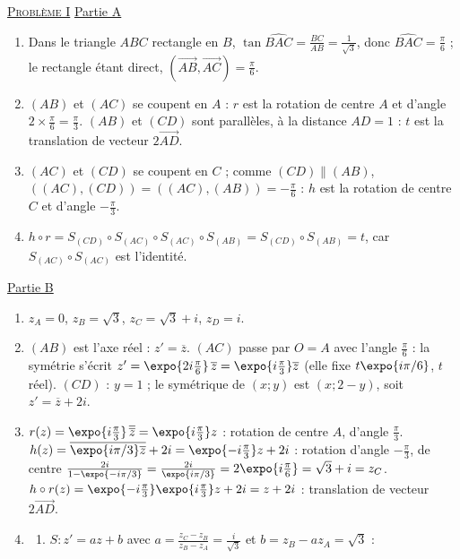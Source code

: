 \begin{corrige}
\noindent \underline{\textsc{Probl\`eme I}} \newline
\underline{Partie A}
\begin{enumerate}
\item Dans le triangle $ABC$ rectangle en $B$, $\tan\widehat{BAC} = \frac{BC}{AB} = \frac{1}{\sqrt{3}}$, donc $\widehat{BAC} = \frac{\pi}{6}$ ;
      le rectangle \'etant direct, $(\overrightarrow{AB}, \overrightarrow{AC}) = \frac{\pi}{6}$.
\item $(AB)$ et $(AC)$ se coupent en $A$ : $r$ est la rotation de centre $A$ et d'angle $2 \times \frac{\pi}{6} = \frac{\pi}{3}$.
      $(AB)$ et $(CD)$ sont parall\`eles, \`a la distance $AD = 1$ : $t$ est la translation de vecteur $2\overrightarrow{AD}$.
\item $(AC)$ et $(CD)$ se coupent en $C$ ; comme $(CD) \parallel (AB)$, $((AC) , (CD)) = ((AC) , (AB)) = -\frac{\pi}{6}$ :
      $h$ est la rotation de centre $C$ et d'angle $-\frac{\pi}{3}$.
\item $h \circ r = S_{(CD)} \circ S_{(AC)} \circ S_{(AC)} \circ S_{(AB)} = S_{(CD)} \circ S_{(AB)} = t$, car $S_{(AC)} \circ S_{(AC)}$ est l'identit\'e.
\end{enumerate}
\underline{Partie B}
\begin{enumerate}
\item $z_A = 0$, $z_B = \sqrt{3}$, $z_C = \sqrt{3} + i$, $z_D = i$.
\item $(AB)$ est l'axe r\'eel : $z' = \overline{z}$. $(AC)$ passe par $O = A$ avec l'angle $\frac{\pi}{6}$ : la sym\'etrie s'\'ecrit
      $z' = \expo{2i\frac{\pi}{6}}\,\overline{z} = \expo{i\frac{\pi}{3}}\overline{z}$ (elle fixe $t\expo{i\pi/6}$, $t$ r\'eel).
      $(CD)$ : $y = 1$ ; le sym\'etrique de $(x ; y)$ est $(x ; 2 - y)$, soit $z' = \overline{z} + 2i$.
\item $r(z) = \expo{i\frac{\pi}{3}}\,\overline{\overline{z}} = \expo{i\frac{\pi}{3}} z$ : rotation de centre $A$, d'angle $\frac{\pi}{3}$.
      $h(z) = \overline{\expo{i\pi/3}\overline{z}} + 2i = \expo{-i\frac{\pi}{3}} z + 2i$ : rotation d'angle $-\frac{\pi}{3}$, de centre
      $\frac{2i}{1 - \expo{-i\pi/3}} = \frac{2i}{\expo{i\pi/3}} = 2\expo{i\frac{\pi}{6}} = \sqrt{3} + i = z_C$.
      $h \circ r(z) = \expo{-i\frac{\pi}{3}}\expo{i\frac{\pi}{3}} z + 2i = z + 2i$ : translation de vecteur $2\overrightarrow{AD}$.
\item \begin{enumerate}
      \item $S : z' = az + b$ avec $a = \frac{z_C - z_B}{z_B - z_A} = \frac{i}{\sqrt{3}}$ et $b = z_B - a z_A = \sqrt{3}$ :

\end{enumerate}
\end{enumerate}
\end{corrige}
